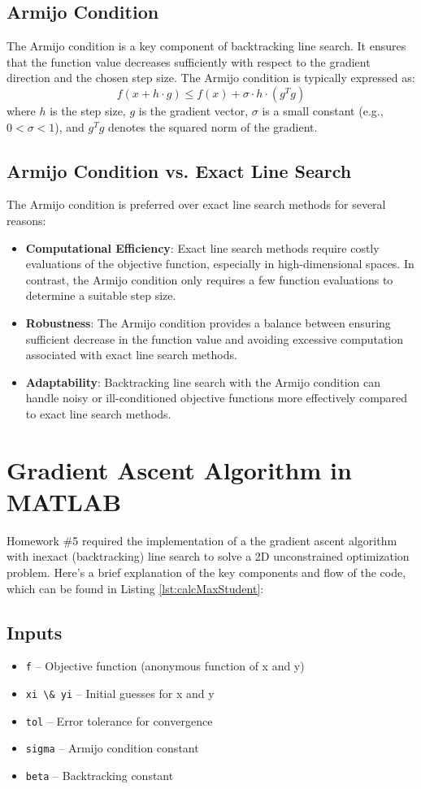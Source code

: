 \documentclass{article}
\newcommand{\mat}[1]{\lstinline[style=matlabstyle]|#1|}
\begin{document}
\subsection{Armijo Condition}
The Armijo condition is a key component of backtracking line search. It ensures that the function value decreases sufficiently with respect to the gradient direction and the chosen step size. The Armijo condition is typically expressed as:
\[
f(x + h \cdot g) \leq f(x) + \sigma \cdot h \cdot (g^T g)
\]
where \( h \) is the step size, \( g \) is the gradient vector, \( \sigma \) is a small constant (e.g., \( 0 < \sigma < 1 \)), and \( g^T g \) denotes the squared norm of the gradient.

\subsection{Armijo Condition vs. Exact Line Search}
The Armijo condition is preferred over exact line search methods for several reasons:
\begin{itemize}
    \item \textbf{Computational Efficiency}: Exact line search methods require costly evaluations of the objective function, especially in high-dimensional spaces. In contrast, the Armijo condition only requires a few function evaluations to determine a suitable step size.
    \item \textbf{Robustness}: The Armijo condition provides a balance between ensuring sufficient decrease in the function value and avoiding excessive computation associated with exact line search methods.
    \item \textbf{Adaptability}: Backtracking line search with the Armijo condition can handle noisy or ill-conditioned objective functions more effectively compared to exact line search methods.
\end{itemize}

\section{Gradient Ascent Algorithm in MATLAB}
Homework \#5 required the implementation of a the gradient ascent algorithm with inexact (backtracking) line search  to solve a 2D unconstrained optimization problem. Here's a brief explanation of the key components and flow of the code, which can be found in Listing \ref{lst:calcMaxStudent}:

\subsection{Inputs}
\begin{itemize}
    \item \mat{f} --  Objective function (anonymous function of x and y)
    \item \mat{xi \& yi} -- Initial guesses for x and y
    \item \mat{tol} -- Error tolerance for convergence
    \item \mat{sigma} -- Armijo condition constant
    \item \mat{beta} -- Backtracking constant
\end{itemize}
\end{document}
